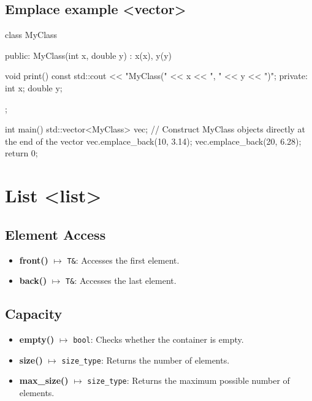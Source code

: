 \documentclass{report}
\begin{document}
    \bigbreak \noindent 
    \subsection{Emplace example <vector>}
    \bigbreak \noindent 
    \begin{cppcode}
class MyClass {
public:
    MyClass(int x, double y) : x(x), y(y) {}

    void print() const { std::cout << "MyClass(" << x << ", " << y << ")\n"; }
private:
    int x;
    double y;
};

int main() {
    std::vector<MyClass> vec;
    // Construct MyClass objects directly at the end of the vector
    vec.emplace_back(10, 3.14);
    vec.emplace_back(20, 6.28); return 0; }
    \end{cppcode}

    \pagebreak \bigbreak \noindent 
    \section{\LARGE List <list>}
    \bigbreak \noindent 
    \subsection{Element Access}
    \begin{itemize}
        \item \textbf{front()} $\mapsto$ \texttt{T\&}: Accesses the first element.
        \item \textbf{back()} $\mapsto$ \texttt{T\&}: Accesses the last element.
    \end{itemize}

    \bigbreak \noindent 
    \subsection{Capacity}
    \begin{itemize}
        \item \textbf{empty()} $\mapsto$ \texttt{bool}: Checks whether the container is empty.
        \item \textbf{size()} $\mapsto$ \texttt{size\_type}: Returns the number of elements.
        \item \textbf{max\_size()} $\mapsto$ \texttt{size\_type}: Returns the maximum possible number of elements.
    \end{itemize}

    \bigbreak \noindent 
\end{document}
